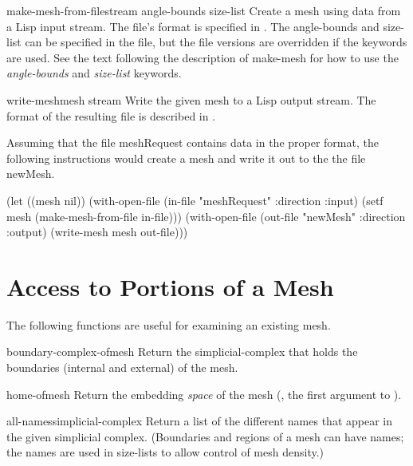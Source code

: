 \begin{functiondef}{make-mesh-from-file}{stream
\key angle-bounds size-list}
Create a mesh using data from a Lisp input stream.  
The file's format is specified
in .  The angle-bounds and size-list can be
specified in the file, but the file versions are overridden if the
keywords are used.  See the text following the description of {\sf
make-mesh} for how to use the {\em angle-bounds} and {\em size-list} keywords.
\end{functiondef}

\begin{functiondef}{write-mesh}{mesh stream}
Write the given mesh to a Lisp output stream.  
The format of
the resulting file is described in .
\end{functiondef}

Assuming that the file meshRequest contains data in the proper format,
the following instructions would create a mesh and write it out to the
the file newMesh.

\begin{code}
(let ((mesh nil))
  (with-open-file (in-file "meshRequest" :direction :input)
    (setf mesh (make-mesh-from-file in-file)))
  (with-open-file (out-file "newMesh" :direction :output)
    (write-mesh mesh out-file)))
\end{code}

\section{Access to Portions of a Mesh}

The following functions are useful for examining an existing mesh.

\begin{functiondef}{boundary-complex-of}{mesh}
Return the simplicial-complex that holds the boundaries (internal and
external) of the mesh.
\end{functiondef}

\begin{functiondef}{home-of}{mesh}
Return the embedding {\em space} of the mesh (\ie, the first argument
to ).
\end{functiondef}

\begin{functiondef}{all-names}{simplicial-complex}
Return a list of the different names that appear in the given
simplicial complex.
(Boundaries and regions of a mesh can have names; the names are used
in size-lists to allow control of mesh density.)
\end{functiondef}

